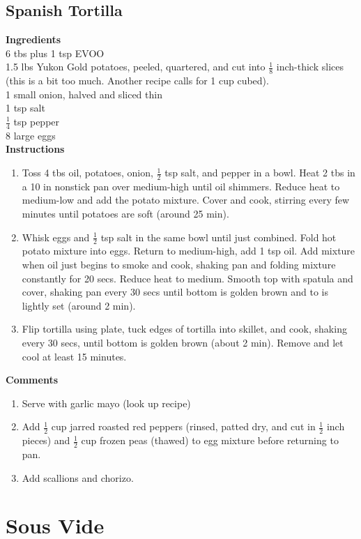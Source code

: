 \documentclass{article}
\numberwithin{figure}{section}
\numberwithin{equation}{section}
\begin{document}
\pagebreak
\subsection{Spanish Tortilla}
{\bf Ingredients}\\
6 tbs plus 1 tsp EVOO\\
1.5 lbs Yukon Gold potatoes, peeled, quartered, and cut into $\frac{1}{8}$ inch-thick slices (this is a bit too much.  Another recipe calls for 1 cup cubed).\\
1 small onion, halved and sliced thin\\
1 tsp salt\\
$\frac{1}{4}$ tsp pepper\\
8 large eggs\\

{\bf Instructions}
\begin{enumerate}
\item Toss 4 tbs oil, potatoes, onion, $\frac{1}{2}$ tsp salt, and pepper in a bowl.  Heat 2 tbs in a 10 in nonstick pan over medium-high until oil shimmers.  Reduce heat to medium-low and add the potato mixture.  Cover and cook, stirring every few minutes until potatoes are soft (around 25 min).
\item Whisk eggs and $\frac{1}{2}$ tsp salt in the same bowl until just combined.  Fold hot potato mixture into eggs.  Return to medium-high, add 1 tsp oil.  Add mixture when oil just begins to smoke and cook, shaking pan and folding mixture constantly for 20 secs.  Reduce heat to medium.  Smooth top with spatula and cover, shaking pan every 30 secs until bottom is golden brown and to is lightly set (around 2 min).
\item Flip tortilla using plate, tuck edges of tortilla into skillet, and cook, shaking every 30 secs, until bottom is golden brown (about 2 min).  Remove and let cool at least 15 minutes.
\end{enumerate}

{\bf Comments}
\begin{enumerate}
\item Serve with garlic mayo (look up recipe)
\item Add $\frac{1}{2}$ cup jarred roasted red peppers (rinsed, patted dry, and cut in $\frac{1}{2}$ inch pieces) and $\frac{1}{2}$ cup frozen peas (thawed) to egg mixture before returning to pan. 
\item Add scallions and chorizo.
\end{enumerate}

\pagebreak
\section{Sous Vide}
\end{document}
